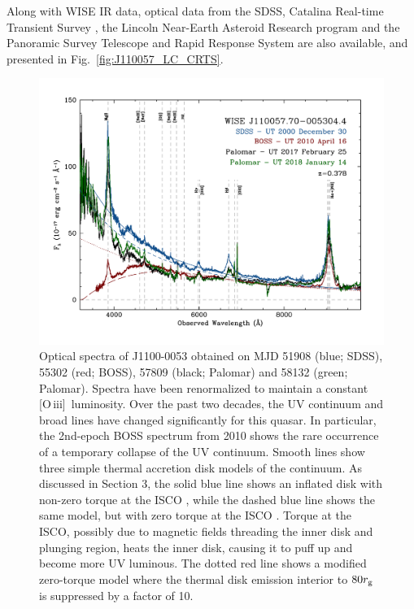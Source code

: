 \documentclass[a4paper,fleqn,usenatbib]{mnras}
\begin{document}
Along with WISE IR data, optical data from the SDSS, Catalina
Real-time Transient Survey \citep[CRTS;][]{Drake2009, Mahabal2011},
the Lincoln Near-Earth Asteroid Research \citep[LINEAR; ][]{Sesar2011}
program and the Panoramic Survey Telescope and Rapid Response System
\citep[PanSTARRS;][]{Kaiser2010, Stubbs2010, Tonry2012, Magnier2013}
are also available, and presented in Fig.~\ref{fig:J110057_LC_CRTS}.




\begin{figure}
  \centering
  \includegraphics[width=17.00cm, trim=0.0cm 0.0cm 0.0cm 0.0cm, clip]
  {../plots/spectra/w1100m0052_sdss2.pdf}
\vspace{-16pt}
  \caption[]{
    Optical spectra of J1100-0053 obtained on MJD 51908 (blue; SDSS),
    55302 (red; BOSS), 57809 (black; Palomar) and 58132 (green;
    Palomar). Spectra have been renormalized to maintain a constant
    [O\,{\sc iii}]\ luminosity. Over the past two decades, the UV
    continuum and broad lines have changed significantly for this quasar.
    In particular, the 2nd-epoch BOSS spectrum from 2010 shows the rare
    occurrence of a temporary collapse of the UV continuum.  Smooth lines
    show three simple thermal accretion disk models of the continuum.  
    As discussed in Section 3, the
    solid blue line shows an inflated disk with non-zero torque at the
    ISCO \cite[e.g.,][]{Sirko_Goodman2003}, while the dashed blue line
    shows the same model, but with zero torque at the ISCO \cite[i.e.,
    equivalent to a simple $\alpha$-disk model,][]{SS73}.  Torque at the
    ISCO, possibly due to magnetic fields threading the inner disk and
    plunging region, heats the inner disk, causing it to puff up and
    become more UV luminous.  The dotted red line shows a modified
    zero-torque model where the thermal disk emission interior to $80
    r_{\rm g}$ is suppressed by a factor of 10.}
  \label{fig:J110057_spectra}
\end{figure}
\end{document}
